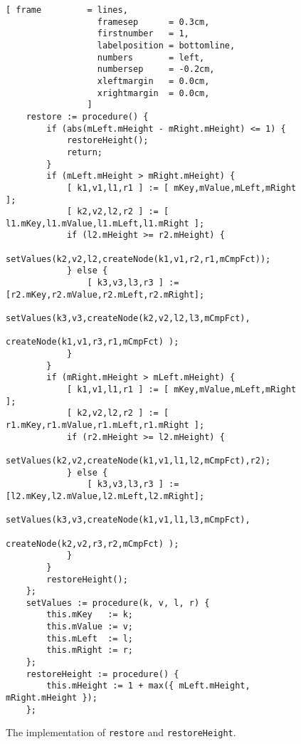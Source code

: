 \begin{figure}[!ht]
\centering
\begin{Verbatim}[ frame         = lines, 
                  framesep      = 0.3cm, 
                  firstnumber   = 1,
                  labelposition = bottomline,
                  numbers       = left,
                  numbersep     = -0.2cm,
                  xleftmargin   = 0.0cm,
                  xrightmargin  = 0.0cm,
                ]
    restore := procedure() {
        if (abs(mLeft.mHeight - mRight.mHeight) <= 1) {
            restoreHeight();
            return;
        }
        if (mLeft.mHeight > mRight.mHeight) {
            [ k1,v1,l1,r1 ] := [ mKey,mValue,mLeft,mRight ];
            [ k2,v2,l2,r2 ] := [ l1.mKey,l1.mValue,l1.mLeft,l1.mRight ];
            if (l2.mHeight >= r2.mHeight) {
                setValues(k2,v2,l2,createNode(k1,v1,r2,r1,mCmpFct));
            } else {
                [ k3,v3,l3,r3 ] := [r2.mKey,r2.mValue,r2.mLeft,r2.mRight];
                setValues(k3,v3,createNode(k2,v2,l2,l3,mCmpFct),
                                createNode(k1,v1,r3,r1,mCmpFct) );
            }
        }
        if (mRight.mHeight > mLeft.mHeight) {
            [ k1,v1,l1,r1 ] := [ mKey,mValue,mLeft,mRight ];
            [ k2,v2,l2,r2 ] := [ r1.mKey,r1.mValue,r1.mLeft,r1.mRight ];
            if (r2.mHeight >= l2.mHeight) {
                setValues(k2,v2,createNode(k1,v1,l1,l2,mCmpFct),r2);
            } else {
                [ k3,v3,l3,r3 ] := [l2.mKey,l2.mValue,l2.mLeft,l2.mRight];
                setValues(k3,v3,createNode(k1,v1,l1,l3,mCmpFct),
                                createNode(k2,v2,r3,r2,mCmpFct) );
            }
        }
        restoreHeight();
    };
    setValues := procedure(k, v, l, r) {
        this.mKey   := k;
        this.mValue := v;
        this.mLeft  := l;
        this.mRight := r;
    };
    restoreHeight := procedure() {
        this.mHeight := 1 + max({ mLeft.mHeight, mRight.mHeight });
    };
\end{Verbatim}
\vspace*{-0.3cm}
\caption{The implementation of \texttt{restore} and \texttt{restoreHeight}.}
\label{fig:avl-tree.stlx:restore}
\end{figure}


